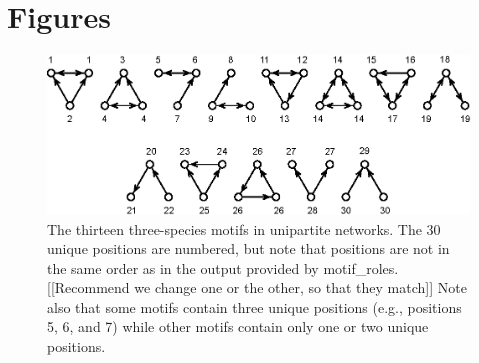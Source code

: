 \documentclass[12pt]{article}
\begin{document}
\section{Figures}

	\begin{figure}[h!]
		\label{3sp_unipartite}
		\caption{The thirteen three-species motifs in unipartite networks. The 30 unique positions are numbered, but note that positions are not in the same order as in the output provided by motif\_roles. [[Recommend we change one or the other, so that they match]] Note also that some motifs contain three unique positions (e.g., positions 5, 6, and 7) while other motifs contain only one or two unique positions.}
		\includegraphics*[width=\textwidth]{unipartite_motifs.eps}
	\end{figure}
\end{document}
